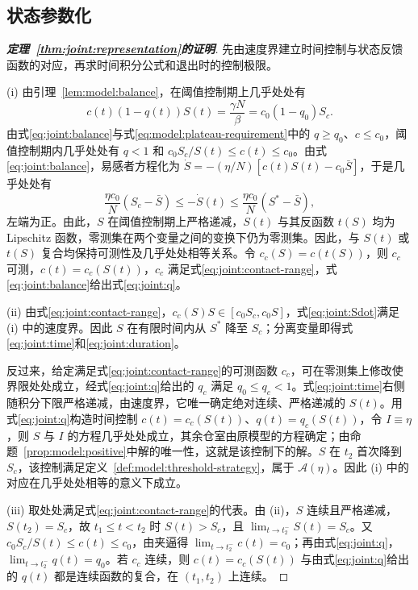 \subsection{状态参数化}
\label{sec:proof:representation}
\begin{proof}[\normalfont\bfseries 定理~\ref{thm:joint:representation}的证明]
先由速度界建立时间控制与状态反馈函数的对应，再求时间积分公式和退出时的控制极限。

(i) 由引理~\ref{lem:model:balance}，在阈值控制期上几乎处处有
\begin{equation}
c(t)(1-q(t))S(t)=\frac{\gamma N}{\beta}
=c_0(1-q_0)S_c.
\label{eq:joint:balance}
\end{equation}
由式\eqref{eq:joint:balance}与式\eqref{eq:model:plateau-requirement}中的 $q\ge q_0$、$c\le c_0$，阈值控制期内几乎处处有 $q<1$ 和 $c_0S_c/S(t)\le c(t)\le c_0$。由式\eqref{eq:joint:balance}，易感者方程化为 $\dot S=-(\eta/N)[c(t)S(t)-c_0\bar S]$，于是几乎处处有
\[
\frac{\eta c_0}{N}(S_c-\bar S)\le-\dot S(t)\le\frac{\eta c_0}{N}(S^*-\bar S),
\]
左端为正。由此，$S$ 在阈值控制期上严格递减，$S(t)$ 与其反函数 $t(S)$ 均为 Lipschitz 函数，零测集在两个变量之间的变换下仍为零测集。因此，与 $S(t)$ 或 $t(S)$ 复合均保持可测性及几乎处处相等关系。令 $c_c(S)=c(t(S))$，则 $c_c$ 可测，$c(t)=c_c(S(t))$，$c_c$ 满足式\eqref{eq:joint:contact-range}，式\eqref{eq:joint:balance}给出式\eqref{eq:joint:q}。

(ii) 由式\eqref{eq:joint:contact-range}，$c_c(S)S\in[c_0S_c,c_0S]$，式\eqref{eq:joint:Sdot}满足 (i) 中的速度界。因此 $S$ 在有限时间内从 $S^*$ 降至 $S_c$；分离变量即得式\eqref{eq:joint:time}和\eqref{eq:joint:duration}。

反过来，给定满足式\eqref{eq:joint:contact-range}的可测函数 $c_c$，可在零测集上修改使界限处处成立，经式\eqref{eq:joint:q}给出的 $q_c$ 满足 $q_0\le q_c<1$。式\eqref{eq:joint:time}右侧随积分下限严格递减，由速度界，它唯一确定绝对连续、严格递减的 $S(t)$。用式\eqref{eq:joint:q}构造时间控制 $c(t)=c_c(S(t))$、$q(t)=q_c(S(t))$，令 $I\equiv\eta$，则 $S$ 与 $I$ 的方程几乎处处成立，其余仓室由原模型的方程确定；由命题~\ref{prop:model:positive}中解的唯一性，这就是该控制下的解。$S$ 在 $t_2$ 首次降到 $S_c$，该控制满足定义~\ref{def:model:threshold-strategy}，属于 $\mathcal A(\eta)$。因此 (i) 中的对应在几乎处处相等的意义下成立。

(iii) 取处处满足式\eqref{eq:joint:contact-range}的代表。由 (ii)，$S$ 连续且严格递减，$S(t_2)=S_c$，故 $t_1\le t<t_2$ 时 $S(t)>S_c$，且 $\lim_{t\to t_2^{-}}S(t)=S_c$。又 $c_0S_c/S(t)\le c(t)\le c_0$，由夹逼得 $\lim_{t\to t_2^{-}}c(t)=c_0$；再由式\eqref{eq:joint:q}，$\lim_{t\to t_2^{-}}q(t)=q_0$。若 $c_c$ 连续，则 $c(t)=c_c(S(t))$ 与由式\eqref{eq:joint:q}给出的 $q(t)$ 都是连续函数的复合，在 $(t_1,t_2)$ 上连续。
\end{proof}

